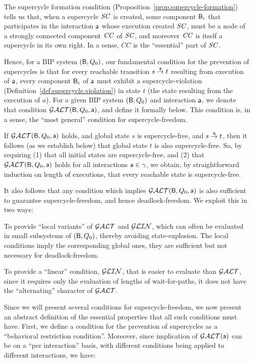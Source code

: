 
The supercycle formation condition (Proposition~\ref{prop:supercycle-formation}) tells us that, when a supercycle $\SC$ is
created, some component $\B_i$ that participates in the interaction $\act$ whose execution created $\SC$, must be a node
of a strongly connected component $\CC$ of $\SC$, and moreover $\CC$ is itself a supercycle in its own right. In a sense,
$CC$ is the ``essential'' part of $\SC$.

Hence, for a BIP system $(\B, Q_0)$, our fundamental condition for the prevention of supercycles is that 
for every reachable transition  $s \goesto[\act] t$ resulting from execution of $\act$, 
every component $\B_i$ of $\act$
must exhibit a supercycle-violation (Definition~\ref{def:supercycle.violation}) in state $t$ (the state resulting
from the execution of $a$). For a given BIP system $(\B, Q_0)$ and interaction $\act$, we denote that condition $\GAO(\B, Q_0, \act)$, and define it formally below.
This condition is, in a sense, the ``most general'' condition for supercycle-freedom.

If $\GAO(\B, Q_0, \act)$ holds, and global state $s$ is supercycle-free, and $s \goesto[\act] t$, then it follows (as
we establish below) that global state $t$ is also supercycle-free. 
So, by requiring (1) that all initial states are supercycle-free, and
(2) that $\GAO(\B, Q_0, \act)$ holds for all interactions $\act \in \gamma$, we
obtain, by straightforward induction on length of executions, that every reachable state is supercycle-free.

It also follows that any condition which implies $\GAO(\B, Q_0, \act)$ is also sufficient to guarantee  supercycle-freedom, and
hence deadlock-freedom. We exploit this in two ways:
\bn

\item To provide ``local variants'' of $\GAO$ and $\GLin$,  which can often be
evaluated in small subsystems of $(\B, Q_0)$, thereby avoiding state-explosion. The local conditions imply the
corresponding global ones, \ie they are sufficient but not necessary for deadlock-freedom.

\item To provide a ``linear'' condition, $\GLin$, that is easier to evaluate than $\GAO$, since it requires only the
evaluation of lengths of wait-for-paths, \ie it does not have the ``alternating'' character of $\GAO$. 

\en

Since we will present several conditions for supercycle-freedom, we now present an abstract definition of the essential
properties that all such conditions must have. First, we define a condition for the prevention of supercycles as a 
``behavioral restriction condition''. Moreover, since implication of $\GAO(\act)$ can be on a ``per interaction'' basis,
with different conditions being applied to different interactions, we have:


